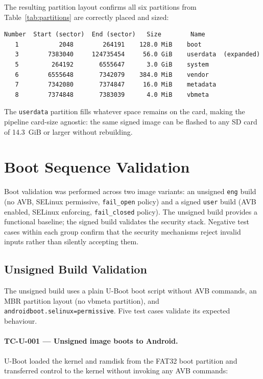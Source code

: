 The resulting partition layout confirms all six partitions from Table~\ref{tab:partitions} are correctly placed and sized:

\begin{lstlisting}[caption={Final GPT partition layout after flashing to 64~GiB SD card}]
Number  Start (sector)  End (sector)   Size        Name
   1           2048        264191    128.0 MiB    boot
   3        7383040     124735454     56.0 GiB    userdata  (expanded)
   5         264192       6555647      3.0 GiB    system
   6        6555648       7342079    384.0 MiB    vendor
   7        7342080       7374847     16.0 MiB    metadata
   8        7374848       7383039      4.0 MiB    vbmeta
\end{lstlisting}

The \texttt{userdata} partition fills whatever space remains on the card, making the pipeline card-size agnostic: the same signed image can be flashed to any SD card of 14.3~GiB or larger without rebuilding.

\section{Boot Sequence Validation}

Boot validation was performed across two image variants: an unsigned \texttt{eng} build (no AVB, SELinux permissive, \texttt{fail\_open} policy) and a signed \texttt{user} build (AVB enabled, SELinux enforcing, \texttt{fail\_closed} policy). The unsigned build provides a functional baseline; the signed build validates the security stack. Negative test cases within each group confirm that the security mechanisms reject invalid inputs rather than silently accepting them.

\subsection{Unsigned Build Validation}

The unsigned build uses a plain U-Boot boot script without AVB commands, an MBR partition layout (no vbmeta partition), and \texttt{androidboot.selinux=permissive}. Five test cases validate its expected behaviour.

\paragraph{TC-U-001 --- Unsigned image boots to Android.}
U-Boot loaded the kernel and ramdisk from the FAT32 boot partition and transferred control to the kernel without invoking any AVB commands:

